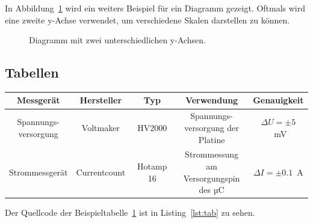 \clearpage

In Abbildung~\ref{fig:pgfplot2y} wird ein weiters Beispiel für ein Diagramm gezeigt. Oftmals wird eine zweite y-Achse verwendet, um verschiedene Skalen darstellen zu können.

\begin{figure}[hbt]
	\centering
	
	\caption[Diagramm mit zwei unterschiedlichen y-Achsen.]{Diagramm mit zwei unterschiedlichen y-Achsen.}
	\label{fig:pgfplot2y}
\end{figure}

\clearpage

\subsection{Tabellen}

\begin{table}[hbt]	
	\centering
	\renewcommand{\arraystretch}{1.5}	%
	\label{tab:bsp}
	\begin{tabular}{ccccc}
		\textbf{Messgerät} & \textbf{Hersteller} & \textbf{Typ} & \textbf{Verwendung} & \textbf{Genauigkeit}\\ 
		\hline 
		\hline 
		\parbox[t]{0.2\linewidth}{\centering Spannungs-\\versorgung} & Voltmaker & HV2000 & \parbox[t]{0.2\linewidth}{\centering Spannungs-\\versorgung der\\Platine} & $\Delta U = \pm 5 $~mV \\ %
		Strommessgerät & Currentcount & Hotamp 16 & \parbox[t]{0.2\linewidth}{ \centering Strommessung\\am Versorgungspin\\des µC} & $\Delta I = \pm 0.1$~A \\ 
		\hline 
	\end{tabular} 
\end{table}

Der Quellcode der Beispieltabelle~\ref{tab:bsp} ist in Listing~\ref{lst:tab} zu sehen.

